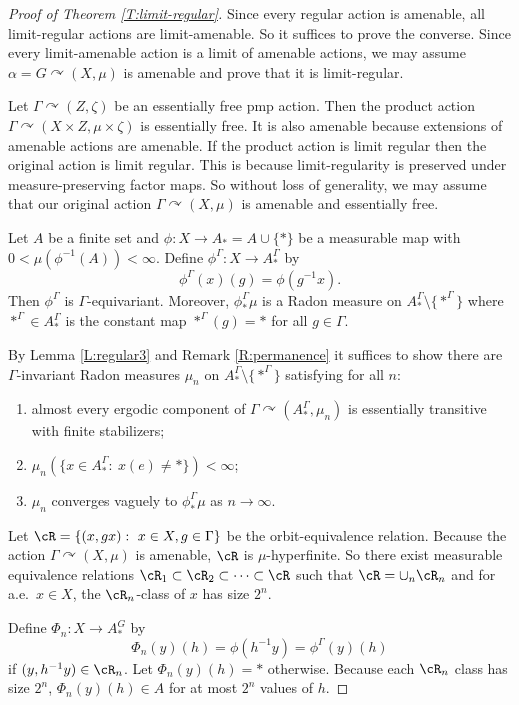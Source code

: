 \documentclass[12pt]{article}
\theoremstyle{plain}
\theoremstyle{definition}
\theoremstyle{remark}
\newcommand{\G}{\Gamma}
\renewcommand\a{\alpha}
\def\cc{{\curvearrowright}}
\begin{document}
\begin{proof}[Proof of Theorem \ref{T:limit-regular}]

Since every regular action is amenable, all limit-regular actions are limit-amenable. So it suffices to prove the converse. Since every limit-amenable action is a limit of amenable actions, we may assume $\a=G\cc (X,\mu)$ is amenable and prove that it is limit-regular. 

Let $\G \cc (Z,\zeta)$ be an essentially free pmp action. Then the product action $\G \cc (X\times Z,\mu\times \zeta)$ is essentially free. It is also amenable because extensions of amenable actions are amenable. If the product action is limit regular then the original action is limit regular. This is because limit-regularity is preserved under measure-preserving factor maps. So without loss of generality, we may assume that our original action $\G \cc (X,\mu)$ is amenable and essentially free.

 


Let $A$ be a finite set and $\phi:X \to A_*=A\cup\{*\}$ be a measurable map with $0<\mu(\phi^{-1}(A))<\infty$. Define $\phi^\G:X \to A_*^\G$ by
$$\phi^\G(x)(g)=\phi(g^{-1}x).$$
Then $\phi^\G$ is $\G$-equivariant. Moreover, $\phi^\G_*\mu$ is a Radon measure on $A_*^\G \setminus \{*^\G\}$ where $*^\G \in A_*^\G$ is the constant map $*^\G(g)=*$ for all $g\in \G$. 


By Lemma \ref{L:regular3} and Remark \ref{R:permanence} it suffices to show there are $\G$-invariant Radon measures $\mu_n$ on $A_*^\G \setminus \{*^\G\}$ satisfying for all $n$:
\begin{enumerate}
    \item almost every ergodic component of $\G \cc (A_*^\G,\mu_n)$ is essentially transitive with finite stabilizers;
        \item $\mu_n(\{x\in A_*^\G:~ x(e) \ne *\})<\infty$;
    \item $\mu_n$ converges vaguely to $\phi^\G_*\mu$  as $n\to\infty$.
\end{enumerate}


Let $\cR=\{(x,gx):~x\in X, g\in \G\}$ be the orbit-equivalence relation. Because the action $\G \cc (X,\mu)$ is amenable, $\cR$ is $\mu$-hyperfinite. So there exist measurable equivalence relations $\cR_1 \subset \cR_2 \subset \cdots \subset \cR$ such that $\cR=\cup_n \cR_n$ and for a.e.\ $x\in X$, the $\cR_n$-class of $x$ has size $2^n$. 

Define $\Phi_n: X \to A_*^G$ by 
$$\Phi_{n}(y)(h) = \phi(h^{-1}y)=\phi^\G(y)(h)$$
if $(y,h^{-1}y)\in \cR_n$. Let $\Phi_{n}(y)(h)=\ast$ otherwise. Because each $\cR_n$ class has size $2^n$,  $\Phi_{n}(y)(h)\in A$ for at most $2^n$ values of $h$. %



\end{proof}
\end{document}
